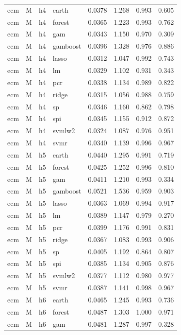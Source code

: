 \begin{ThreePartTable}
\begin{longtable}[t]{llclcccc}
\addlinespace
ecm & M & h4 & earth & 0.0378 & 1.268 & 0.993 & 0.605\\
ecm & M & h4 & forest & 0.0365 & 1.223 & 0.993 & 0.762\\
ecm & M & h4 & gam & 0.0343 & 1.150 & 0.970 & 0.309\\
ecm & M & h4 & gamboost & 0.0396 & 1.328 & 0.976 & 0.886\\
ecm & M & h4 & lasso & 0.0312 & 1.047 & 0.992 & 0.743\\
ecm & M & h4 & lm & 0.0329 & 1.102 & 0.931 & 0.343\\
ecm & M & h4 & pcr & 0.0338 & 1.134 & 0.989 & 0.822\\
ecm & M & h4 & ridge & 0.0315 & 1.056 & 0.988 & 0.759\\
ecm & M & h4 & sp & 0.0346 & 1.160 & 0.862 & 0.798\\
ecm & M & h4 & spi & 0.0345 & 1.155 & 0.912 & 0.872\\
ecm & M & h4 & svmlw2 & 0.0324 & 1.087 & 0.976 & 0.951\\
ecm & M & h4 & svmr & 0.0340 & 1.139 & 0.996 & 0.967\\
\addlinespace
ecm & M & h5 & earth & 0.0440 & 1.295 & 0.991 & 0.719\\
ecm & M & h5 & forest & 0.0425 & 1.252 & 0.996 & 0.810\\
ecm & M & h5 & gam & 0.0411 & 1.210 & 0.993 & 0.334\\
ecm & M & h5 & gamboost & 0.0521 & 1.536 & 0.959 & 0.903\\
ecm & M & h5 & lasso & 0.0363 & 1.069 & 0.994 & 0.917\\
ecm & M & h5 & lm & 0.0389 & 1.147 & 0.979 & 0.270\\
ecm & M & h5 & pcr & 0.0399 & 1.176 & 0.991 & 0.831\\
ecm & M & h5 & ridge & 0.0367 & 1.083 & 0.993 & 0.906\\
ecm & M & h5 & sp & 0.0405 & 1.192 & 0.864 & 0.807\\
ecm & M & h5 & spi & 0.0385 & 1.134 & 0.905 & 0.876\\
ecm & M & h5 & svmlw2 & 0.0377 & 1.112 & 0.980 & 0.977\\
ecm & M & h5 & svmr & 0.0387 & 1.141 & 0.998 & 0.967\\
\addlinespace
ecm & M & h6 & earth & 0.0465 & 1.245 & 0.993 & 0.736\\
ecm & M & h6 & forest & 0.0487 & 1.303 & 1.000 & 0.971\\
ecm & M & h6 & gam & 0.0481 & 1.287 & 0.997 & 0.328\\

\end{longtable}
\end{ThreePartTable}
